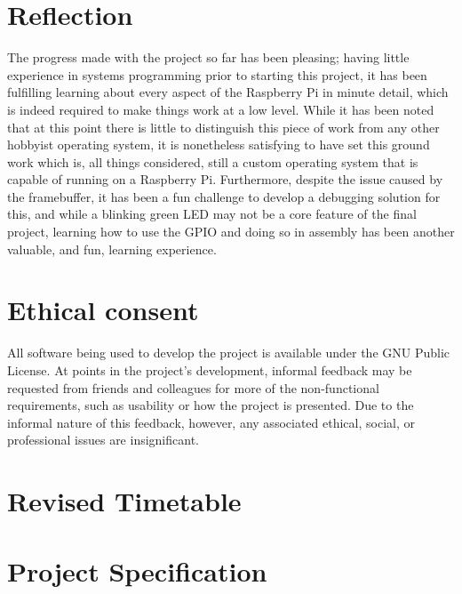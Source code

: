 \documentclass[10pt,a4paper]{article}
\begin{document}
\section{Reflection}
The progress made with the project so far has been pleasing; having little
experience in systems programming prior to starting this project, it has been
fulfilling learning about every aspect of the Raspberry Pi in minute detail,
which is indeed required to make things work at a low level. While it has been
noted that at this point there is little to distinguish this piece of work from
any other hobbyist operating system, it is nonetheless satisfying to have set
this ground work which is, all things considered, still a custom operating
system that is capable of running on a Raspberry Pi. Furthermore, despite the
issue caused by the framebuffer, it has been a fun challenge to develop a
debugging solution for this, and while a blinking green LED may not be a core
feature of the final project, learning how to use the GPIO and doing so in
assembly has been another valuable, and fun, learning experience.

\section{Ethical consent}
All software being used to develop the project is available under the GNU Public
License. At points in the project's development, informal feedback may be
requested from friends and colleagues for more of the non-functional
requirements, such as usability or how the project is presented. Due to the
informal nature of this feedback, however, any associated ethical, social, or
professional issues are insignificant.



\begin{appendices}

    \section{Revised Timetable}

    \section{Project Specification}

    

\end{appendices}
\end{document}
